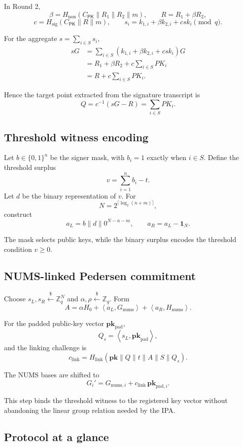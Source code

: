 \documentclass[10pt,a4paper]{article}
\newcommand{\Zq}{\mathbb{Z}_q}
\newcommand{\ip}[2]{\left\langle #1,#2\right\rangle}
\newcommand{\CPK}{C_{\mathsf{PK}}}
\newcommand{\pkpad}{\mathbf{pk}_{\mathrm{pad}}}
\begin{document}
In Round 2,
\[
\beta=H_{\mathrm{non}}(\CPK\|R_1\|R_2\|m),\qquad
R=R_1+\beta R_2,
\]
\[
c=H_{\mathrm{sig}}(\CPK\|R\|m),
\qquad
s_i=k_{1,i}+\beta k_{2,i}+csk_i\pmod q.
\]

For the aggregate
$s=\sum_{i\in S}s_i$,
\begin{align}
sG&=\sum_{i\in S}(k_{1,i}+\beta k_{2,i}+csk_i)G\\
&=R_1+\beta R_2+c\sum_{i\in S}PK_i\\
&=R+c\sum_{i\in S}PK_i.
\end{align}

Hence the target point extracted from the signature transcript is
\[
Q=c^{-1}(sG-R)=\sum_{i\in S}PK_i.
\]

\subsection{Threshold witness encoding}

Let $b\in\{0,1\}^n$ be the signer mask, with $b_i=1$ exactly when
$i\in S$. Define the threshold surplus
\[
v=\sum_{i=1}^{n}b_i-t.
\]
Let $d$ be the binary representation of $v$. For
\[
N=2^{\lceil\log_2(n+m)\rceil},
\]
construct
\[
a_L=b\|d\|0^{N-n-m},\qquad
a_R=a_L-\mathbf1_N.
\]

The mask selects public keys, while the binary surplus encodes the threshold
condition $v\ge0$.

\subsection{NUMS-linked Pedersen commitment}

Choose
$s_L,s_R\xleftarrow{\$}\Zq^N$
and
$\alpha,\rho\xleftarrow{\$}\Zq$.
Form
\[
A=\alpha H_0+\ip{a_L}{G_{\mathrm{nums}}}
+\ip{a_R}{H_{\mathrm{nums}}}.
\]

For the padded public-key vector $\pkpad$,
\[
Q_s=\ip{s_L}{\pkpad},
\]
and the linking challenge is
\[
c_{\mathrm{link}}=
H_{\mathrm{link}}(\mathbf{pk}\|Q\|t\|A\|S\|Q_s).
\]

The NUMS bases are shifted to
\[
G_i'=G_{\mathrm{nums},i}
+c_{\mathrm{link}}\,\mathbf{pk}_{\mathrm{pad},i}.
\]

This step binds the threshold witness to the registered key vector without
abandoning the linear group relation needed by the IPA.

\subsection{Protocol at a glance}
\end{document}

